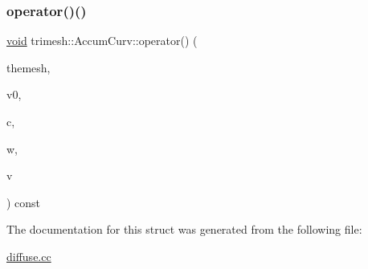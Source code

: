 \subsubsection{\texorpdfstring{operator()()}{operator()()}}
{\footnotesize\ttfamily \hyperlink{namespacetrimesh_a784ddfd979e1c579bda795a8edfc3f43}{void} trimesh\+::\+Accum\+Curv\+::operator() (\begin{DoxyParamCaption}\item[{const \hyperlink{classtrimesh_1_1TriMesh}{Tri\+Mesh} $\ast$}]{themesh,  }\item[{int}]{v0,  }\item[{\hyperlink{namespacetrimesh_a4fc2b83feba99c931f837a0c7d4b4df1}{vec} \&}]{c,  }\item[{float}]{w,  }\item[{int}]{v }\end{DoxyParamCaption}) const\hspace{0.3cm}{\ttfamily [inline]}}



The documentation for this struct was generated from the following file\+:\begin{DoxyCompactItemize}
\item 
\hyperlink{diffuse_8cc}{diffuse.\+cc}\end{DoxyCompactItemize}
